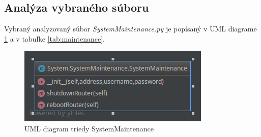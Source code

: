 \subsection{Analýza vybraného súboru}
Vybraný analyzovaný súbor \textit{SystemMaintenance.py} je popísaný v UML diagrame \ref{fig:systemMaintenance} a v tabuľke \ref{tab:maintenance}.
\begin{table}[H]
\centering
{}
\caption{Tabuľka metód triedy SystemMaintenance}
\label{tab:maintenance}
\end{table}
\begin{figure}[H]
\centering
\includegraphics[scale=0.6]{../text/SystemMaintenance.png}
\caption{UML diagram triedy SystemMaintenance}
\label{fig:systemMaintenance}
\end{figure}